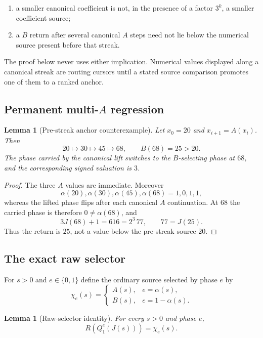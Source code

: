 \documentclass[11pt]{article}
\newtheorem{lemma}[theorem]{Lemma}
\begin{document}
\begin{enumerate}[label=(N\arabic*)]
\item a smaller canonical coefficient is not, in the presence of a factor
      $3^k$, a smaller coefficient source;
\item a $B$ return after several canonical $A$ steps need not lie below the
      numerical source present before that streak.
\end{enumerate}

The proof below never uses either implication.  Numerical values displayed
along a canonical streak are routing cursors until a stated source comparison
promotes one of them to a ranked anchor.

\subsection{Permanent multi-$A$ regression}

\begin{lemma}[Pre-streak anchor counterexample]\label{lem:anchor-stress}
Let $x_0=20$ and $x_{i+1}=A(x_i)$.  Then
\[
 20\longmapsto30\longmapsto45\longmapsto68,
 \qquad B(68)=25>20.
\]
The phase carried by the canonical lift switches to the $B$-selecting phase
at $68$, and the corresponding signed valuation is $3$.
\end{lemma}

\begin{proof}
The three $A$ values are immediate.  Moreover
\[
 \alpha(20),\alpha(30),\alpha(45),\alpha(68)=1,0,1,1,
\]
whereas the lifted phase flips after each canonical $A$ continuation.  At
$68$ the carried phase is therefore $0\ne\alpha(68)$, and
\[
 3J(68)+1=616=2^3\,77,
 \qquad 77=J(25).
\]
Thus the return is $25$, not a value below the pre-streak source $20$.
\end{proof}

\subsection{The exact raw selector}

For $s>0$ and $e\in\{0,1\}$ define the ordinary source selected by phase $e$
by
\[
 \chi_e(s)=
 \begin{cases}
   A(s),&e=\alpha(s),\\
   B(s),&e=1-\alpha(s).
 \end{cases}
\]

\begin{lemma}[Raw-selector identity]\label{lem:raw-selector}
For every $s>0$ and phase $e$,
\[
 \boxed{R\!\left(Q_1^e(J(s))\right)=\chi_e(s).}
\]
\end{lemma}
\end{document}
